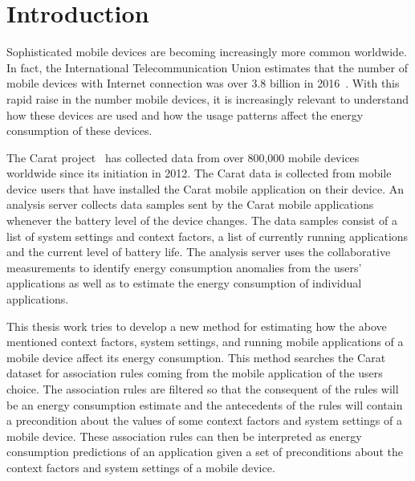\section{Introduction}


Sophisticated mobile devices are becoming increasingly more common worldwide. In fact, the International Telecommunication Union estimates that the number of mobile devices with Internet connection was over 3.8 billion in 2016~\cite{ITUstats}. With this rapid raise in the number mobile devices, it is increasingly relevant to understand how these devices are used and how the usage patterns affect the energy consumption of these devices.    

The Carat project~\cite{Oliner:2012:CED:2387858.2387864, Oliner:2013:CCE:2517351.2517354, 7840871} has collected data from over 800,000 mobile devices worldwide since its initiation in 2012. The Carat data is collected from mobile device users that have installed the Carat mobile application on their device. An analysis server collects data samples sent by the Carat mobile applications whenever the battery level of the device changes. The data samples consist of a list of system settings and context factors, a list of currently running applications and the current level of battery life. The analysis server uses the collaborative measurements to identify energy consumption anomalies from the users' applications as well as to estimate the energy consumption of individual applications.

This thesis work tries to develop a new method for estimating how the above mentioned context factors, system settings, and running mobile applications of a mobile device affect its energy consumption. This method searches the Carat dataset for association rules coming from the mobile application of the users choice. The association rules are filtered so that the consequent of the rules will be an energy consumption estimate and the antecedents of the rules will contain a precondition about the values of some context factors and system settings of a mobile device. These association rules can then be interpreted as energy consumption predictions of an application given a set of preconditions about the context factors and system settings of a mobile device.      

